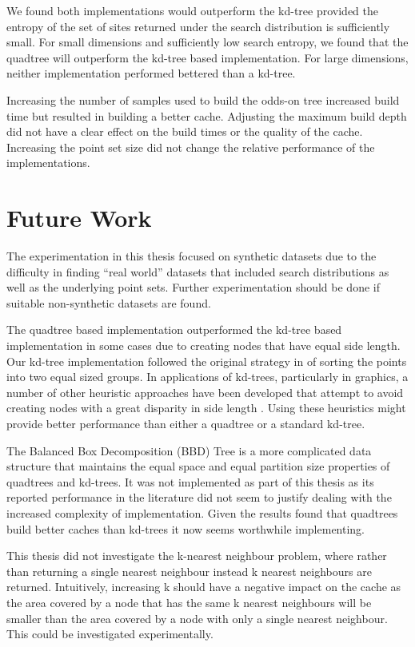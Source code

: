 \documentclass[mcs]{scsthesis}
\begin{document}
We found both implementations would outperform the kd-tree provided the entropy
of the set of sites returned under the search distribution is sufficiently
small. For small dimensions and sufficiently low search entropy, we found that
the quadtree will outperform the kd-tree based implementation. For large
dimensions, neither implementation performed bettered than a kd-tree.

Increasing the number of samples used to build the odds-on tree increased
build time but resulted in building a better cache. Adjusting the maximum
build depth did not have a clear effect on the build times or the quality of the
cache. Increasing the point set size did not change the relative performance
of the implementations.

\section{Future Work}

The experimentation in this thesis focused on synthetic datasets due to the
difficulty in finding ``real world'' datasets that included search distributions
as well as the underlying point sets. Further experimentation should be done
if suitable non-synthetic datasets are found.

The quadtree based implementation outperformed the kd-tree based implementation
in some cases due to creating nodes that have equal side length. Our kd-tree
implementation followed the original strategy in \cite{kdtree} of sorting the
points into two equal sized groups. In applications of kd-trees, particularly
in graphics, a number of other heuristic approaches have been developed that 
attempt to avoid creating nodes with a great disparity in side length
\cite{physicallybasedrendering}. Using these heuristics might provide better
performance than either a quadtree or a standard kd-tree.

The Balanced Box Decomposition (BBD) Tree \cite{optimalann} is a more
complicated data structure that maintains the equal space and equal partition
size properties of quadtrees and kd-trees. It was not implemented as part of
this thesis as its reported performance in the literature did not seem to
justify dealing with the increased complexity of implementation. Given the
results found that quadtrees build better caches than kd-trees it now seems
worthwhile implementing.

This thesis did not investigate the k-nearest neighbour problem, where rather
than returning a single nearest neighbour instead k nearest neighbours are
returned. Intuitively, increasing k should have a negative impact on the cache
as the area covered by a node that has the same k nearest neighbours will be
smaller than the area covered by a node with only a single nearest neighbour.
This could be investigated experimentally.
\end{document}
